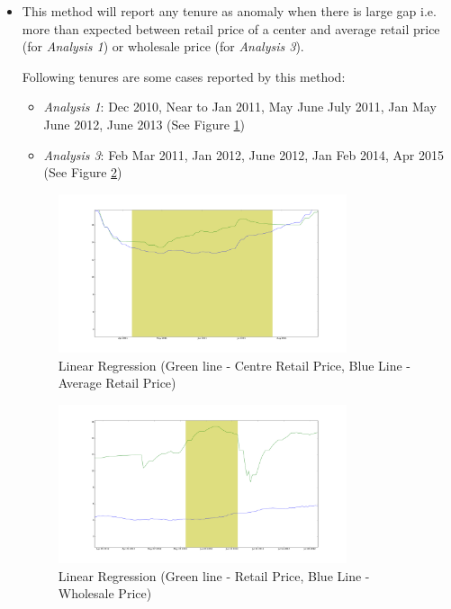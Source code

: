 \documentclass[a4paper,10pt]{report}
\begin{document}
		\begin{itemize}
			\item This method will report any tenure as anomaly when there is large gap i.e. more than expected between retail price of a center and average retail price (for \textit{Analysis 1}) or wholesale price (for \textit{Analysis 3}).
			
			
			
			Following tenures are some cases reported by this method:
			\begin{itemize}
				\item \textit{Analysis 1}: Dec 2010, Near to Jan 2011, May June July 2011, Jan May June 2012, June 2013 (See Figure \ref{fig:12211})
				\item \textit{Analysis 3}: Feb Mar 2011, Jan 2012, June 2012, Jan Feb 2014, Apr 2015 (See Figure \ref{fig:12231})
			\end{itemize}
			\begin{figure}[H]
		    	\centering
  		    	\includegraphics[width=0.8\textwidth]{graphs/12211.png}
		    	\caption{Linear Regression (Green line - Centre Retail Price, Blue Line - Average Retail Price)}
		    	\label{fig:12211}
			\end{figure}
			
			\begin{figure}[H]
		    	\centering
  		    	\includegraphics[width=0.8\textwidth]{graphs/12231.png}
		    	\caption{Linear Regression (Green line - Retail Price, Blue Line - Wholesale Price)}
		    	\label{fig:12231}
			\end{figure}
			

\end{itemize}
\end{document}
